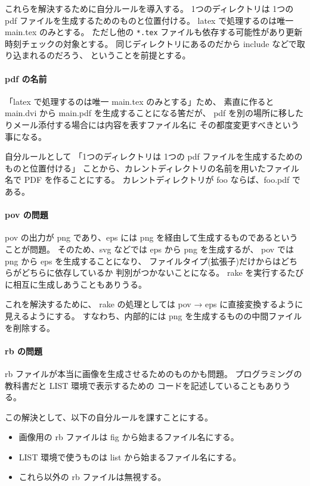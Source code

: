 \documentclass[a4paper,12pt]{jsarticle}
\begin{document}
これらを解決するために自分ルールを導入する。
1つのディレクトリは 1つの pdf ファイルを生成するためのものと位置付ける。
latex で処理するのは唯一 main.tex のみとする。
ただし他の \verb/*.tex/ ファイルも依存する可能性があり更新時刻チェックの対象とする。
同じディレクトリにあるのだから include などで取り込まれるのだろう、
ということを前提とする。

\paragraph{pdf の名前}

「latex で処理するのは唯一 main.tex のみとする」ため、
素直に作ると main.dvi から main.pdf を生成することになる筈だが、
pdf を別の場所に移したりメール添付する場合には内容を表すファイル名に
その都度変更すべきという事になる。

自分ルールとして
「1つのディレクトリは 1つの pdf ファイルを生成するためのものと位置付ける」
ことから、カレントディレクトリの名前を用いたファイル名で PDF を作ることにする。
カレントディレクトリが foo ならば、foo.pdf である。

\paragraph{pov の問題}

pov の出力が png であり、eps には png を経由して生成するものであるということが問題。
そのため、svg などでは eps から png を生成するが、
pov では png から eps を生成することになり、
ファイルタイプ(拡張子)だけからはどちらがどちらに依存しているか
判別がつかないことになる。
rake を実行するたびに相互に生成しあうこともありうる。

これを解決するために、
rake の処理としては pov → eps に直接変換するように見えるようにする。
すなわち、内部的には png を生成するものの中間ファイルを削除する。

\paragraph{rb の問題}

rb ファイルが本当に画像を生成させるためのものかも問題。
プログラミングの教科書だと LIST 環境で表示するための
コードを記述していることもありうる。

この解決として、以下の自分ルールを課すことにする。

\begin{itemize}
  \item 画像用の rb ファイルは fig から始まるファイル名にする。
  \item LIST 環境で使うものは list から始まるファイル名にする。
  \item これら以外の rb ファイルは無視する。
\end{itemize}
\end{document}
